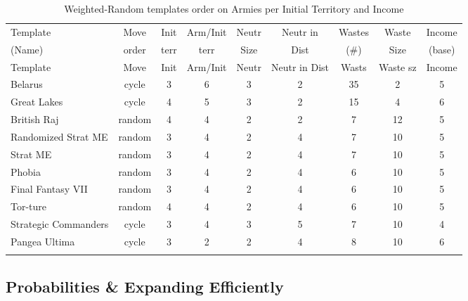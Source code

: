 \scriptsize
\begin{longtable}{|l|c|c|c|c|c|c|c|c|}
\hline
\rowcolor{Baby_Blue}
Template & Move & Init & Arm/\newline Init & Neutr & Neutr in & Wastes & Waste & Income \\ 
\rowcolor{Baby_Blue}
(Name)   & order& terr & terr            & Size  & Dist      & (\#)   & Size  & (base) \\ \hline\hline
\endfirsthead
\hline
\rowcolor{Baby_Blue}
Template & Move & Init & Arm/\newline Init & Neutr & Neutr in Dist & Wasts & Waste sz & Income \\ \hline\hline
\endhead
Belarus                 & cycle  & 3 & 6 & 3 & 2 & 35 & 2  & 5 \\ \hline
Great Lakes             & cycle  & 4 & 5 & 3 & 2 & 15 & 4  & 6 \\ \hline
British Raj             & random & 4 & 4 & 2 & 2 & 7  & 12 & 5 \\ 
Randomized Strat ME     & random & 3 & 4 & 2 & 4 & 7  & 10 & 5 \\ 
Strat ME                & random & 3 & 4 & 2 & 4 & 7  & 10 & 5 \\ 
Phobia                  & random & 3 & 4 & 2 & 4 & 6  & 10 & 5 \\ 
Final Fantasy VII       & random & 3 & 4 & 2 & 4 & 6  & 10 & 5 \\ 
Tor-ture                & random & 4 & 4 & 2 & 4 & 6  & 10 & 5 \\ 
Strategic Commanders    & cycle  & 3 & 4 & 3 & 5 & 7  & 10 & 4 \\ \hline
Pangea Ultima           & cycle  & 3 & 2 & 2 & 4 & 8  & 10 & 6 \\ \hline
\caption{Weighted-Random templates order on Armies per Initial Territory and Income}
\label{table:wr_overview}
\end{longtable}
\normalsize


\subsection{Probabilities \& Expanding Efficiently}

